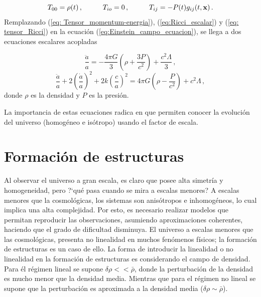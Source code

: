 \begin{equation}
T_{00}= \rho(t)\,, \hspace{1cm} T_{io}=0\,, \hspace{1cm} T_{ij}=-P(t)g_{ij}(t,\bf{x})\,.
\label{eq: Tensor_momentum-energia}
\end{equation}
%
Remplazando (\ref{eq: Tensor_momentum-energia}), (\ref{eq:Ricci_escalar}) y (\ref{eq: tensor_Ricci}) en la ecuación (\ref{eq:Einstein_campo_ecuacion}), se llega a dos ecuaciones escalares acopladas

\begin{equation}
\frac{\ddot{a}}{a} = -\frac{4\pi G}{3}\left(\rho + \frac{3P}{c^{2}} \right) + \frac{c^{2}\Lambda}{3}\,,
\end{equation}
\begin{equation}
\frac{\ddot{a}}{a}+2 \left(\frac{\dot{a}}{a}\right)^{2} + 2k\left(\frac{c}{a} \right)^{2} =4\pi G\left( \rho - \frac{P}{c^{2}}\right)+ c^{2}\Lambda\,,
\end{equation}
%
donde $\rho$ es la densidad y $P$ es la presión.

La importancia de estas ecuaciones radica en que permiten conocer la evolución del universo (homogéneo e isótropo) usando el factor de escala. 


\section{Formación de estructuras}
\label{sec: Estructure_Formation}




Al observar el universo a gran escala, es claro que posee alta simetría y homogeneidad, pero ?`qué pasa cuando se mira a escalas menores? A escalas menores que la cosmológicas, los sistemas son anisótropos e inhomogéneos, lo cual implica una alta complejidad. Por esto, es necesario realizar modelos que permitan reproducir las observaciones, asumiendo aproximaciones coherentes,  haciendo que el grado de dificultad disminuya. El universo a escalas menores que las cosmológicas, presenta no linealidad en muchos fenómenos físicos; la formación de estructuras es un caso de ello. La forma de introducir la linealidad o no linealidad en la formación de estructuras es considerando el campo de densidad. Para él régimen lineal se supone $\delta\rho << \bar{\rho}$, donde la perturbación de la densidad es mucho menor que la densidad media. Mientras que para el régimen no lineal se supone que la perturbación es aproximada a la densidad media ($\delta\rho \sim \bar{\rho}$).


